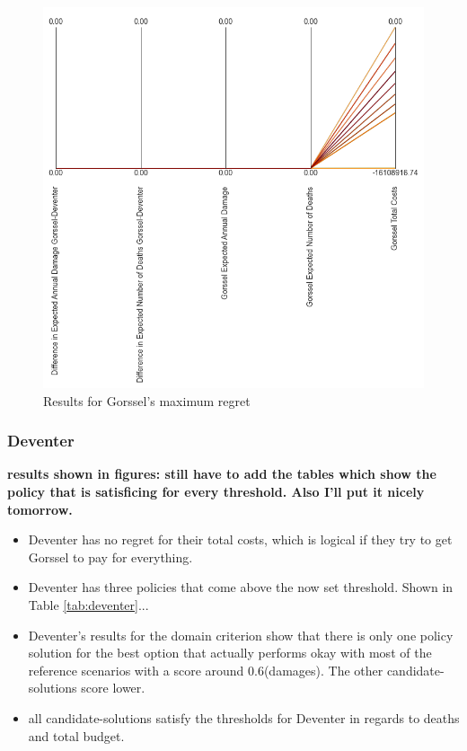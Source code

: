 \begin{figure}[H]
\begin{minipage}[b]{0.4\textwidth}
    \includegraphics[width=1.15\textwidth]{report/figures/results/regret_figure_Gorssel.png}
    \caption{Results for Gorssel's maximum regret}
    \label{fig:regret_gorssel}
  \end{minipage}
\end{figure}




\subsubsection{Deventer}
\textbf{results shown in figures: still have to add the tables which show the policy that is satisficing for every threshold. Also I'll put it nicely tomorrow. }
\begin{itemize}
    \item Deventer has no regret for their total costs, which is logical if they try to get Gorssel to pay for everything.
    \item Deventer has three policies that come above the now set threshold. Shown in Table \ref{tab:deventer}...
    \item Deventer's results for the domain criterion show that there is only one policy solution for the best option that actually performs okay with most of the reference scenarios with a score around 0.6(damages). The other candidate-solutions score lower. 
    \item all candidate-solutions satisfy the thresholds for Deventer in regards to deaths and total budget.
\end{itemize}

